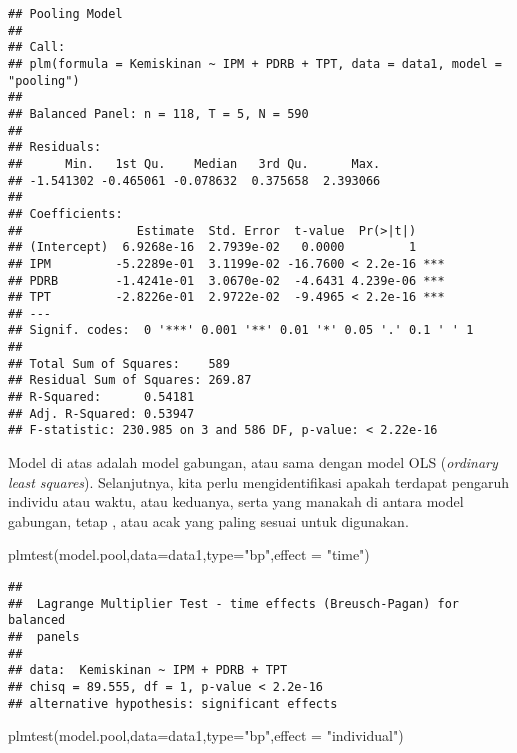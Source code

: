 \documentclass[
]{book}
\newenvironment{Shaded}{\begin{snugshade}}{\end{snugshade}}
\newcommand{\AttributeTok}[1]{\textcolor[rgb]{0.77,0.63,0.00}{#1}}
\newcommand{\FunctionTok}[1]{\textcolor[rgb]{0.00,0.00,0.00}{#1}}
\newcommand{\NormalTok}[1]{#1}
\newcommand{\StringTok}[1]{\textcolor[rgb]{0.31,0.60,0.02}{#1}}
\begin{document}
\begin{verbatim}
## Pooling Model
## 
## Call:
## plm(formula = Kemiskinan ~ IPM + PDRB + TPT, data = data1, model = "pooling")
## 
## Balanced Panel: n = 118, T = 5, N = 590
## 
## Residuals:
##      Min.   1st Qu.    Median   3rd Qu.      Max. 
## -1.541302 -0.465061 -0.078632  0.375658  2.393066 
## 
## Coefficients:
##                Estimate  Std. Error  t-value  Pr(>|t|)    
## (Intercept)  6.9268e-16  2.7939e-02   0.0000         1    
## IPM         -5.2289e-01  3.1199e-02 -16.7600 < 2.2e-16 ***
## PDRB        -1.4241e-01  3.0670e-02  -4.6431 4.239e-06 ***
## TPT         -2.8226e-01  2.9722e-02  -9.4965 < 2.2e-16 ***
## ---
## Signif. codes:  0 '***' 0.001 '**' 0.01 '*' 0.05 '.' 0.1 ' ' 1
## 
## Total Sum of Squares:    589
## Residual Sum of Squares: 269.87
## R-Squared:      0.54181
## Adj. R-Squared: 0.53947
## F-statistic: 230.985 on 3 and 586 DF, p-value: < 2.22e-16
\end{verbatim}

Model di atas adalah model gabungan, atau sama dengan model OLS (\emph{ordinary least squares}). Selanjutnya, kita perlu mengidentifikasi apakah terdapat pengaruh individu atau waktu, atau keduanya, serta yang manakah di antara model gabungan, tetap , atau acak yang paling sesuai untuk digunakan.

\begin{Shaded}
\begin{Highlighting}[]
\FunctionTok{plmtest}\NormalTok{(model.pool,}\AttributeTok{data=}\NormalTok{data1,}\AttributeTok{type=}\StringTok{"bp"}\NormalTok{,}\AttributeTok{effect =} \StringTok{"time"}\NormalTok{)}
\end{Highlighting}
\end{Shaded}

\begin{verbatim}
## 
##  Lagrange Multiplier Test - time effects (Breusch-Pagan) for balanced
##  panels
## 
## data:  Kemiskinan ~ IPM + PDRB + TPT
## chisq = 89.555, df = 1, p-value < 2.2e-16
## alternative hypothesis: significant effects
\end{verbatim}

\begin{Shaded}
\begin{Highlighting}[]
\FunctionTok{plmtest}\NormalTok{(model.pool,}\AttributeTok{data=}\NormalTok{data1,}\AttributeTok{type=}\StringTok{"bp"}\NormalTok{,}\AttributeTok{effect =} \StringTok{"individual"}\NormalTok{)}
\end{Highlighting}
\end{Shaded}
\end{document}
